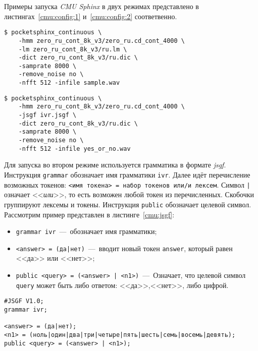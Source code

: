 Примеры запуска \textit{CMU Sphinx} в двух режимах представлено в
листингах~\ref{cmu:config:1} и~\ref{cmu:config:2} соответвенно.\\

\begin{minipage}{\linewidth}
\begin{lstlisting}[caption={Запуск \textit{CMU Sphinx}. Вариант 1},label={cmu:config:1}]
$ pocketsphinx_continuous \
    -hmm zero_ru_cont_8k_v3/zero_ru.cd_cont_4000 \
    -lm zero_ru_cont_8k_v3/ru.lm \
    -dict zero_ru_cont_8k_v3/ru.dic \
    -samprate 8000 \
    -remove_noise no \
    -nfft 512 -infile sample.wav
\end{lstlisting}
\end{minipage}

\begin{minipage}{\linewidth}
\begin{lstlisting}[caption={Запуск \textit{CMU Sphinx}. Вариант 2},label={cmu:config:2}]
$ pocketsphinx_continuous \
    -hmm zero_ru_cont_8k_v3/zero_ru.cd_cont_4000 \
    -jsgf ivr.jsgf \
    -dict zero_ru_cont_8k_v3/ru.dic \
    -samprate 8000 \
    -remove_noise no \
    -nfft 512 -infile yes_or_no.wav
\end{lstlisting}
\end{minipage}

Для запуска во втором режиме используется грамматика в формате \textit{jsgf}.
Инструкция \texttt{grammar} обозначает имя грамматики \texttt{ivr}. Далее
идёт перечисление возможных токенов: \texttt{<имя токена> = набор токенов или/и лексем}.
Символ \texttt{|} означает <<\textit{или}>>, то есть возможен любой токен из перечисленных.
Скобочки группируют лексемы и токены. Инструкция \texttt{public} обозначает целевой символ.
Рассмотрим пример представлен в листинге~\ref{cmu:jsgf}:

\begin{itemize}
    \item \texttt{grammar ivr}~---~обозначает имя грамматики;
    \item \texttt{<answer> = (да|нет)}~---~вводит новый токен \texttt{answer},
    который равен <<да>> или <<нет>>;
    \item \texttt{public <query> = (<answer> | <n1>)}~---~Означает, что целевой
        символ \texttt{query} может быть либо ответом: <<да>>,<<нет>>, либо цифрой.
\end{itemize}


\begin{minipage}{\linewidth}
\captionof{lstlisting}{Пример грамматики}\label{cmu:jsgf}
\begin{Verbatim}[fontsize=\footnotesize]
#JSGF V1.0;
grammar ivr;

<answer> = (да|нет);
<n1> = (ноль|один|два|три|четыре|пять|шесть|семь|восемь|девять);
public <query> = (<answer> | <n1>);

\end{Verbatim}
\end{minipage}

